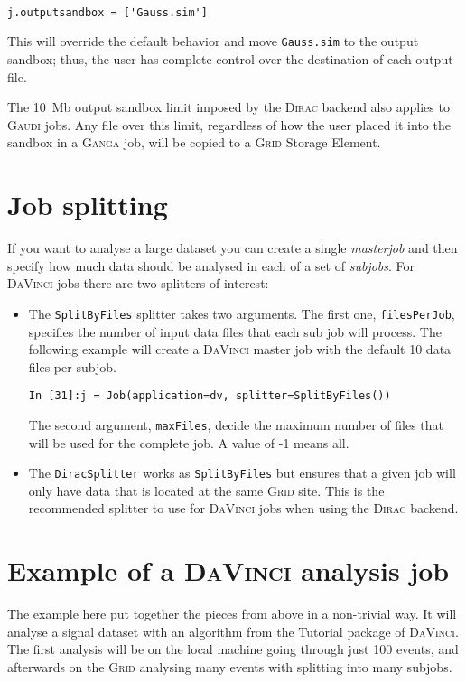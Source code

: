 \documentclass{howto}
\def\ganga {\textsc{Ganga}\xspace}
\def\gaudi {\textsc{Gaudi}\xspace}
\def\davinci {\textsc{DaVinci}\xspace}
\def\dirac {\textsc{Dirac}\xspace}
\def\grid {\textsc{Grid}\xspace}
\begin{document}
\begin{verbatim}

j.outputsandbox = ['Gauss.sim']

\end{verbatim}

This will override the default behavior and move \texttt{Gauss.sim} to the
output sandbox; thus, the user has complete control over the destination of
each output file.

\begin{notice}
  The 10~Mb output sandbox limit imposed by the \dirac backend also applies
  to \gaudi jobs. Any file over this limit, regardless of how the user placed
  it into the sandbox in a \ganga job, will be copied to a \grid
  Storage Element.
\end{notice}


\section{Job splitting}
\label{sec:splitting}
If you want to analyse a large dataset you can create a single
\emph{masterjob} and then specify how much data should be analysed in each of
a set of \emph{subjobs}. For \davinci jobs there are two splitters of interest:
\begin{itemize}
\item The \texttt{SplitByFiles} splitter takes two arguments. The first one,
  \texttt{filesPerJob}, specifies the number of input data files that each sub
  job will process. The following example will create a \davinci master job
  with the default 10 data files per subjob.
\begin{verbatim}
In [31]:j = Job(application=dv, splitter=SplitByFiles())
\end{verbatim}
  The second argument, \texttt{maxFiles}, decide the maximum number of files
  that will be used for the complete job. A value of -1 means all.
\item The \texttt{DiracSplitter} works as \texttt{SplitByFiles} but ensures
  that a given job will only have data that is located at the same \grid
  site. This is the recommended splitter to use for \davinci jobs when using
  the \dirac backend.
\end{itemize}

\section{Example of a \davinci analysis job}
\label{sec:Example}
The example here put together the pieces from above in a non-trivial way. It
will analyse a signal dataset with an algorithm from the Tutorial package of
\davinci. The first analysis will be on the local machine going through just
100 events, and afterwards on the \grid analysing many events with splitting
into many subjobs.
\end{document}
